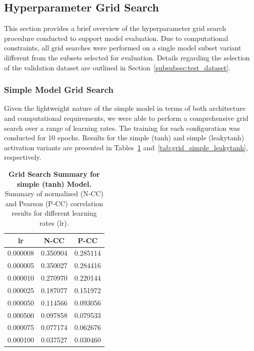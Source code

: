 \subsection{Hyperparameter Grid Search}
\label{subsec:hyperparameter_grid_search}

This section provides a brief overview of the hyperparameter grid search procedure conducted to support model evaluation. Due to computational constraints, all grid searches were performed on a single model subset variant different from the subsets selected for evaluation. Details regarding the selection of the validation dataset are outlined in Section~\ref{subsubsec:test_dataset}.

\subsubsection{Simple Model Grid Search}
\label{subsubsec:simple_model_grid_search}

Given the lightweight nature of the simple model in terms of both architecture and computational requirements, we were able to perform a comprehensive grid search over a range of learning rates. The training for each configuration was conducted for 10 epochs. Results for the simple (tanh) and simple (leakytanh) activation variants are presented in Tables~\ref{tab:grid_simple_tanh} and~\ref{tab:grid_simple_leakytanh}, respectively.

\begin{table}
    \centering\footnotesize\sf
    \begin{tabular}{ccc}
    \toprule
    lr & N-CC & P-CC \\
    \midrule
    0.000008 & 0.350904 & 0.285114 \\
    0.000005 & 0.350027 & 0.284416 \\
    0.000010 & 0.270970 & 0.220144 \\
    0.000025 & 0.187077 & 0.151972 \\
    0.000050 & 0.114566 & 0.093056 \\
    0.000500 & 0.097858 & 0.079533 \\
    0.000075 & 0.077174 & 0.062676 \\
    0.000100 & 0.037527 & 0.030460 \\
    \bottomrule
    \end{tabular}
    \caption{\textbf{Grid Search Summary for simple (tanh) Model.} Summary of normalized (N-CC) and Pearson (P-CC) correlation results for different learning rates (lr).}
    \label{tab:grid_simple_tanh}
\end{table}

